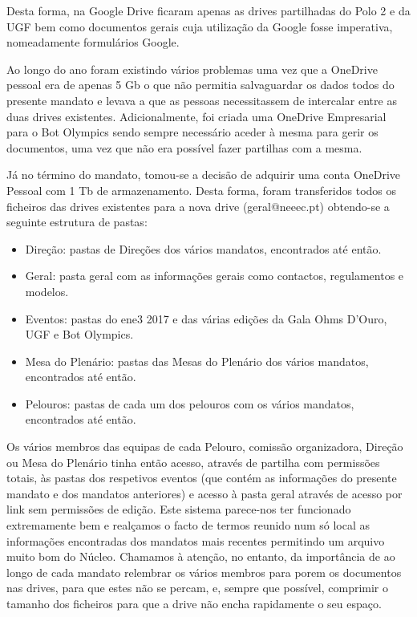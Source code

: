 Desta forma, na Google Drive ficaram apenas as drives partilhadas do Polo 2 e da UGF bem como documentos gerais cuja utilização da Google fosse imperativa, nomeadamente formulários Google.

Ao longo do ano foram existindo vários problemas uma vez que a OneDrive pessoal era de apenas 5 Gb o que não permitia salvaguardar os dados todos do presente mandato e levava a que as pessoas necessitassem de intercalar entre as duas drives existentes. Adicionalmente, foi criada uma OneDrive Empresarial para o Bot Olympics sendo sempre necessário aceder à mesma para gerir os documentos, uma vez que não era possível fazer partilhas com a mesma.

Já no término do mandato, tomou-se a decisão de adquirir uma conta OneDrive Pessoal com 1 Tb de armazenamento. Desta forma, foram transferidos todos os ficheiros das drives existentes para a nova drive (geral@neeec.pt) obtendo-se a seguinte estrutura de pastas:
\begin{itemize}
\item Direção: pastas de Direções dos vários mandatos, encontrados até então.
\item Geral: pasta geral com as informações gerais como contactos, regulamentos e modelos.
\item Eventos: pastas do \acrshort{ene3} 2017 e das várias edições da Gala Ohms D'Ouro, UGF e Bot Olympics.
\item Mesa do Plenário: pastas das Mesas do Plenário dos vários mandatos, encontrados até então.
\item Pelouros: pastas de cada um dos pelouros com os vários mandatos, encontrados até então.
\end{itemize}

Os vários membros das equipas de cada Pelouro, comissão organizadora, Direção ou Mesa do Plenário tinha então acesso, através de partilha com permissões totais, às pastas dos respetivos eventos (que contém as informações do presente mandato e dos mandatos anteriores) e acesso à pasta geral através de acesso por link sem permissões de edição. Este sistema parece-nos ter funcionado extremamente bem e realçamos o facto de termos reunido num só local as informações encontradas dos mandatos mais recentes permitindo um arquivo muito bom do Núcleo. Chamamos à atenção, no entanto, da importância de ao longo de cada mandato relembrar os vários membros para porem os documentos nas drives, para que estes não se percam, e, sempre que possível, comprimir o tamanho dos ficheiros para que a drive não encha rapidamente o seu espaço.